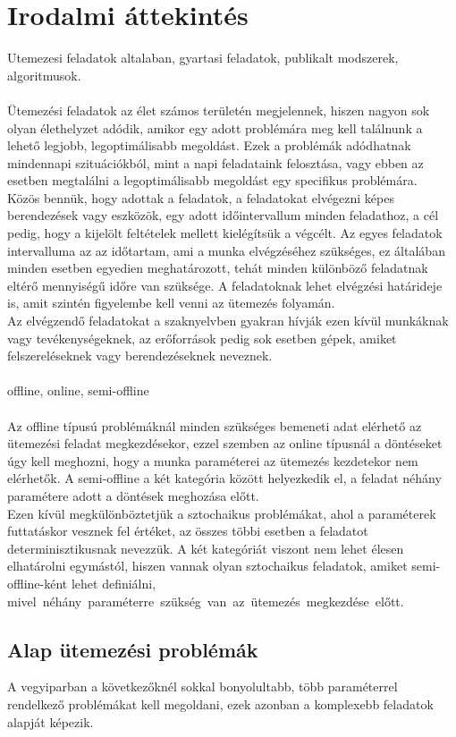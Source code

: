 \documentclass {report}
\begin{document}
\chapter{Irodalmi áttekintés}
Utemezesi feladatok altalaban, gyartasi feladatok, publikalt modszerek, algoritmusok.\\ \\
Ütemezési feladatok az élet számos területén megjelennek, hiszen nagyon sok olyan élethelyzet adódik, amikor egy adott problémára meg kell találnunk a lehető legjobb, legoptimálisabb megoldást. Ezek a problémák adódhatnak mindennapi szituációkból, mint a napi feladataink felosztása, vagy ebben az esetben megtalálni a legoptimálisabb megoldást egy specifikus problémára. \\Közös bennük, hogy adottak a feladatok, a feladatokat elvégezni képes berendezések vagy eszközök, egy adott időintervallum minden feladathoz, a cél pedig, hogy a kijelölt feltételek mellett kielégítsük a végcélt. Az egyes feladatok  intervalluma az az  időtartam, ami a munka elvégzéséhez szükséges, ez általában minden esetben egyedien meghatározott, tehát minden különböző feladatnak eltérő mennyiségű időre van szüksége. A feladatoknak lehet elvégzési határideje is, amit szintén figyelembe kell venni az ütemezés folyamán.  \\
Az elvégzendő feladatokat a szaknyelvben gyakran hívják ezen kívül munkáknak vagy  tevékenységeknek, az erőforrások pedig sok esetben gépek, amiket felszereléseknek vagy berendezéseknek neveznek. \\ \\ offline, online, semi-offline\\ \\
Az offline típusú problémáknál minden szükséges bemeneti adat elérhető az ütemezési feladat megkezdésekor, ezzel szemben az online típusnál a döntéseket úgy kell meghozni, hogy a munka paraméterei az ütemezés kezdetekor nem elérhetők. A semi-offline a két kategória között helyezkedik el, a feladat néhány paramétere adott a döntések meghozása előtt. \\
Ezen kívül megkülönböztetjük a sztochaikus problémákat, ahol a paraméterek futtatáskor vesznek fel értéket, az összes többi esetben a feladatot determinisztikusnak nevezzük. A két kategóriát viszont nem lehet élesen elhatárolni egymástól, hiszen vannak olyan sztochaikus feladatok, amiket semi-offline-ként lehet definiálni, \mbox{mivel néhány paraméterre szükség van az ütemezés megkezdése előtt.} 

\section{Alap ütemezési problémák}
 A vegyiparban a következőknél sokkal bonyolultabb, több paraméterrel rendelkező problémákat kell megoldani, ezek azonban a komplexebb feladatok alapját képezik. 
\end{document}
